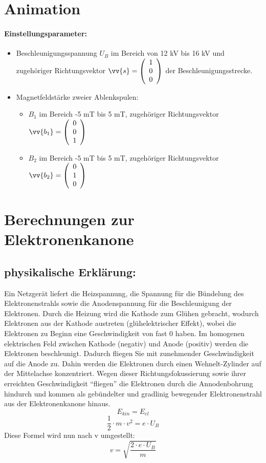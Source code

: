 \section{Animation}
\label{sec:animation}
\paragraph{Einstellungsparameter:}

\begin{itemize}
    \item Beschleunigungsspannung $U_B$ im Bereich von 12 kV bis 16 kV und  zugehöriger Richtungsvektor $\vv{s} = \vektor{1}{0}{0}$ der Beschleunigungsstrecke.
    \item Magnetfeldstärke zweier Ablenkspulen:
    
    \begin{itemize}
        \item $B_1$ im Bereich -5 mT bis 5 mT, zugehöriger Richtungsvektor $\vv{b_1} = \vektor{0}{0}{1}$ %
        \item $B_2$ im Bereich -5 mT bis 5 mT, zugehöriger Richtungsvektor $\vv{b_2} = \vektor{0}{1}{0}$ %
    \end{itemize}

\end{itemize}


\section{Berechnungen zur Elektronenkanone}

\subsection{physikalische Erklärung:}
\label{sec:tolle-section}
 
Ein Netzgerät liefert die Heizspannung, die Spannung für die Bündelung des Elektronenstrahls sowie die Anodenspannung für die Beschleunigung der Elektronen.
Durch die Heizung wird die Kathode zum Glühen gebracht, wodurch Elektronen aus der Kathode austreten (glühelektrischer Effekt), wobei die Elektronen zu Beginn eine Geschwindigkeit von fast $0$ haben.
Im homogenen elektrischen Feld zwischen Kathode (negativ) und Anode (positiv) werden die Elektronen beschleunigt.
Dadurch fliegen Sie mit zunehmender Geschwindigkeit auf die Anode zu.
Dahin werden die Elektronen durch einen Wehnelt-Zylinder auf der Mittelachse konzentriert.
Wegen dieser Richtungsfokussierung sowie ihrer erreichten Geschwindigkeit "`fliegen"' die Elektronen durch die Annodenbohrung hindurch und kommen als gebündelter und gradlinig bewegender Elektronenstrahl aus der Elektronenkanone hinaus.
$$ E_{kin} = E_{el}$$
$$ \frac{1}{2} \cdot m \cdot v^2 = e \cdot U_B$$
Diese Formel wird  nun nach v umgestellt:
\begin{equation}
\label{eq:v}
   v = \sqrt{\frac{2 \cdot e \cdot U_B}{m}} 
\end{equation}
$$ $$

